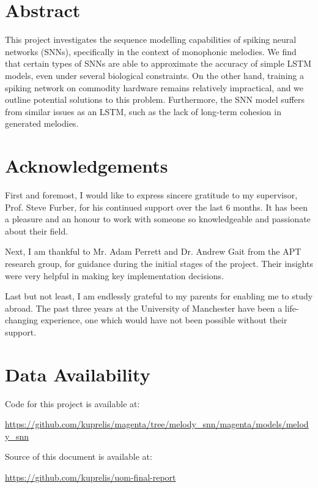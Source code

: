 \documentclass[../report.tex]{subfiles}
\begin{document}
\section*{Abstract}

This project investigates the sequence modelling capabilities of spiking neural
networks (SNNs), specifically in the context of monophonic melodies. We find
that certain types of SNNs are able to approximate the accuracy of simple LSTM
models, even under several biological constraints. On the other hand, training a
spiking network on commodity hardware remains relatively impractical, and we
outline potential solutions to this problem. Furthermore, the SNN model suffers
from similar issues as an LSTM, such as the lack of long-term cohesion in
generated melodies.

\section*{Acknowledgements}

First and foremost, I would like to express sincere gratitude to my supervisor,
Prof. Steve Furber, for his continued support over the last 6 months. It has
been a pleasure and an honour to work with someone so knowledgeable and
passionate about their field.

Next, I am thankful to Mr. Adam Perrett and Dr. Andrew Gait from the APT
research group, for guidance during the initial stages of the project. Their
insights were very helpful in making key implementation decisions.

Last but not least, I am endlessly grateful to my parents for enabling me to
study abroad. The past three years at the University of Manchester have been a
life-changing experience, one which would have not been possible without their
support.

\section*{Data Availability}

Code for this project is available at:

\url{https://github.com/kuprelis/magenta/tree/melody_snn/magenta/models/melody_snn}

Source of this document is available at:

\url{https://github.com/kuprelis/uom-final-report}
\end{document}

